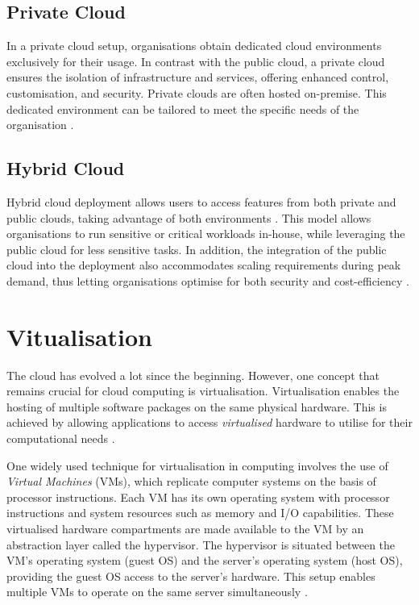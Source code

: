\subsection{Private Cloud}

In a private cloud setup, organisations obtain dedicated cloud environments exclusively for their usage. In contrast with the public cloud, a private cloud ensures the isolation of infrastructure and services, offering enhanced control, customisation, and security. Private clouds are often hosted on-premise. This dedicated environment can be tailored to meet the specific needs of the organisation \cite{ramgovind2010management}.

\subsection{Hybrid Cloud}

Hybrid cloud deployment allows users to access features from both private and public clouds, taking advantage of both environments \cite{ramgovind2010management, dash2016governance}. This model allows organisations to run sensitive or critical workloads in-house, while leveraging the public cloud for less sensitive tasks. In addition, the integration of the public cloud into the deployment also accommodates scaling requirements during peak demand, thus letting organisations optimise for both security and cost-efficiency \cite{huangAchievingBigData2014}.




\section{Vitualisation}

The cloud has evolved a lot since the beginning. However, one concept that remains crucial for cloud computing is virtualisation. Virtualisation enables the hosting of multiple software packages on the same physical hardware. This is achieved by allowing applications to access \textit{virtualised} hardware to utilise for their computational needs \cite{goldbergSurveyVirtualMachine1974}.

One widely used technique for virtualisation in computing involves the use of \textit{Virtual Machines} (VMs), which replicate computer systems on the basis of processor instructions. Each VM has its own operating system with processor instructions and system resources such as memory and I/O capabilities. These virtualised hardware compartments are made available to the VM by an abstraction layer called the hypervisor. The hypervisor is situated between the VM's operating system (guest OS) and the server's operating system (host OS), providing the guest OS access to the server's hardware. This setup enables multiple VMs to operate on the same server simultaneously \cite{goldbergSurveyVirtualMachine1974}.

